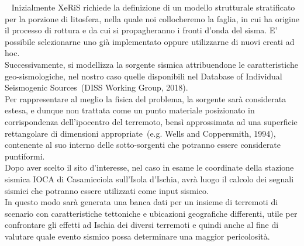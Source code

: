 \documentclass[a4paper,12pt,titlepage]{article}
\begin{document}
~\nocite{XeRiS}
Inizialmente XeRiS richiede la definizione di un modello strutturale stratificato per la porzione di litosfera, nella quale noi collocheremo la faglia, in cui ha origine il processo di rottura e da cui si propagheranno i fronti d'onda del sisma. E' possibile selezionarne uno già implementato oppure utilizzarne di nuovi creati ad hoc.\\
Successivamente, si modellizza la sorgente sismica attribuendone le caratteristiche geo-sismologiche, nel nostro caso quelle disponibili nel Database of Individual Seismogenic Sources~\nocite{DISS}(DISS Working Group, 2018).\\
Per rappresentare al meglio la fisica del problema, la sorgente sarà considerata estesa, e dunque non trattata come un punto materiale posizionato in corrispondenza dell'ipocentro del terremoto, bensì approssimata ad una superficie rettangolare di dimensioni appropriate~\nocite{WellsAndCoppersmith}(e.g. Wells and Coppersmith, 1994), contenente al suo interno delle sotto-sorgenti che potranno essere considerate puntiformi.\\
Dopo aver scelto il sito d'interesse, nel caso in esame le coordinate della stazione sismica IOCA di Casamicciola sull'Isola d'Ischia, avrà luogo il calcolo dei segnali sismici che potranno essere utilizzati come input sismico.\\
In questo modo sarà generata una banca dati per un insieme di terremoti di scenario con caratteristiche tettoniche e ubicazioni geografiche differenti, utile per confrontare gli effetti ad Ischia dei diversi terremoti e quindi anche al fine di valutare quale evento sismico possa determinare una maggior pericolosità.
\clearpage
\end{document}
